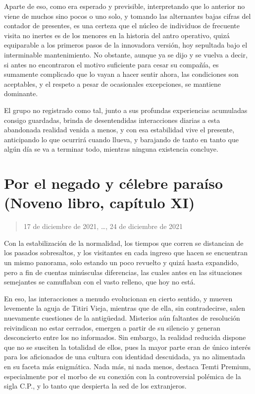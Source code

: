 \documentclass[
]{book}
\begin{document}
Aparte de eso, como era esperado y previsible, interpretando que lo anterior no viene de muchos sino pocos o uno solo, y tomando las alternantes bajas cifras del contador de presentes, es una certeza que el núcleo de individuos de frecuente visita no inertes es de los menores en la historia del antro operativo, quizá equiparable a los primeros pasos de la innovadora versión, hoy sepultada bajo el interminable mantenimiento. No obstante, aunque ya se dijo y se vuelva a decir, si antes no encontraron el motivo suficiente para cesar su compañía, es sumamente complicado que lo vayan a hacer sentir ahora, las condiciones son aceptables, y el respeto a pesar de ocasionales excepciones, se mantiene dominante.

El grupo no registrado como tal, junto a sus profundas experiencias acumuladas consigo guardadas, brinda de desentendidas interacciones diarias a esta abandonada realidad venida a menos, y con esa estabilidad vive el presente, anticipando lo que ocurrirá cuando llueva, y barajando de tanto en tanto que algún día se va a terminar todo, mientras ninguna existencia concluye.

\hypertarget{por-el-negado-y-cuxe9lebre-parauxedso-noveno-libro-capuxedtulo-xi}{%
\section{Por el negado y célebre paraíso (Noveno libro, capítulo XI)}\label{por-el-negado-y-cuxe9lebre-parauxedso-noveno-libro-capuxedtulo-xi}}

\begin{quote}
17 de diciembre de 2021, \ldots, 24 de diciembre de 2021
\end{quote}

Con la estabilización de la normalidad, los tiempos que corren se distancian de los pasados sobresaltos, y los visitantes en cada ingreso que hacen se encuentran un mismo panorama, solo estando un poco revuelto y quizá hasta expandido, pero a fin de cuentas minúsculas diferencias, las cuales antes en las situaciones semejantes se camuflaban con el vasto relleno, que hoy no está.

En eso, las interacciones a menudo evolucionan en cierto sentido, y mueven levemente la aguja de Titiri Vieja, mientras que de ella, sin contradecirse, salen nuevamente cuestiones de la antigüedad. Misterios aún faltantes de resolución reivindican no estar cerrados, emergen a partir de su silencio y generan desconcierto entre los no informados. Sin embargo, la realidad reducida dispone que no se susciten la totalidad de ellos, pues la mayor parte eran de único interés para los aficionados de una cultura con identidad descuidada, ya no alimentada en su faceta más enigmática. Nada más, ni nada menos, destaca Temti Premium, especialmente por el morbo de su conexión con la controversial polémica de la sigla C.P., y lo tanto que despierta la sed de los extranjeros.
\end{document}
